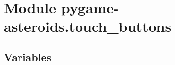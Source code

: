 %
%
%


\section{Module pygame-asteroids.touch\_buttons}

    \label{pygame-asteroids:touch_buttons}


  \subsection{Variables}

